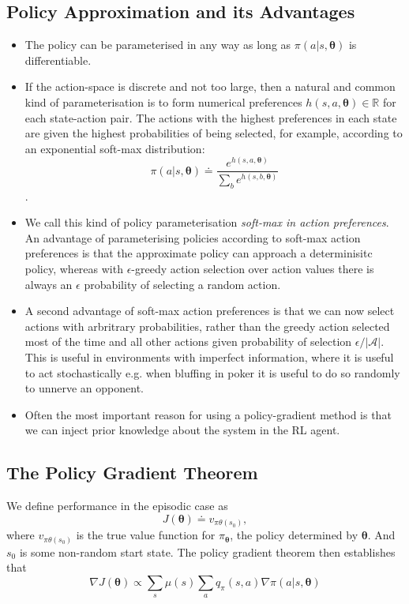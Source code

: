 \subsection{Policy Approximation and its Advantages}
\begin{itemize}

\item The policy can be parameterised in any way as long as $\pi(a|s, \boldsymbol{\theta})$ is differentiable.
\item If the action-space is discrete and not too large, then a natural and common kind of parameterisation is to form numerical preferences $h(s,a, \boldsymbol{\theta}) \in \mathbb{R}$ for each state-action pair. The actions with the highest preferences in each state are given the highest probabilities of being selected, for example, according to an exponential soft-max distribution:
\begin{equation}
\pi(a|s, \boldsymbol{\theta}) \doteq \frac{e^{h(s,a,\boldsymbol{\theta})}}{\sum_{b}e^{h(s,b,\boldsymbol{\theta})}}
\end{equation}.

\item We call this kind of policy parameterisation \textit{soft-max in action preferences}. An advantage of parameterising policies according to soft-max action preferences is that the approximate policy can approach a determinisitc policy, whereas with $\epsilon$-greedy action selection over action values there is always an $\epsilon$ probability of selecting a random action.
\item A second advantage of soft-max action preferences is that we can now select actions with arbritrary probabilities, rather than the greedy action selected most of the time and all other actions given probability of selection $\epsilon / |\mathcal{A}|$. This is useful in environments with imperfect information, where it is useful to act stochastically e.g. when bluffing in poker it is useful to do so randomly to unnerve an opponent.
\item Often the most important reason for using a policy-gradient method is that we can inject prior knowledge about the system in the RL agent.
\end{itemize}

\subsection{The Policy Gradient Theorem}
We define performance in the episodic case as
\begin{equation}
J(\boldsymbol{\theta}) \doteq v_{\pi\theta(s_0)},
\end{equation}
where $v_{\pi\theta(s_0)}$ is the true value function for $\pi_{\boldsymbol{\theta}}$, the policy determined by $\boldsymbol{\theta}$. And $s_0$ is some non-random start state. The policy gradient theorem then establishes that
\begin{equation} \label{eq: policy gradient theorem}
\nabla J(\boldsymbol{\theta}) \propto \sum_{s} \mu(s) \sum_{a} q_\pi(s,a) \nabla \pi(a|s, \boldsymbol{\theta})
\end{equation}

